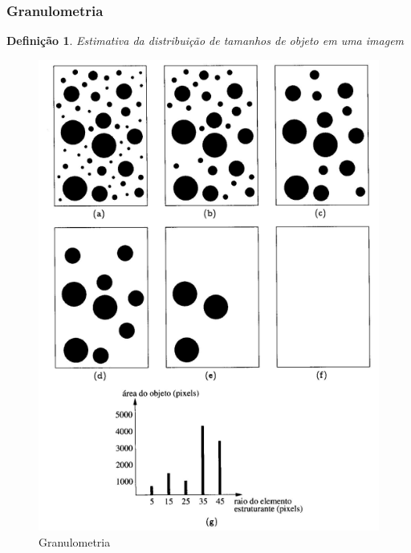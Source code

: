 \documentclass[aspectratio=169]{beamer}
\theoremstyle{Definition}
\newtheorem{defn}{Defini\c c\~ao}
\begin{document}
\begin{frame}
	\frametitle{Granulometria}
	
	\begin{defn}
		Estimativa da distribuição de tamanhos de objeto em uma imagem
	\end{defn}
	
	\begin{figure}[h]
	 	\includegraphics[height=0.5\paperheight]{imagens/granulometria}
		\caption{Granulometria}\label{figLogical}
	\end{figure}

\end{frame}
\end{document}
